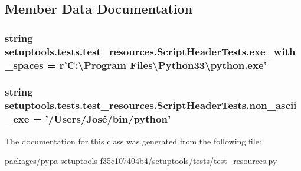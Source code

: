 \subsection{Member Data Documentation}
\hypertarget{classsetuptools_1_1tests_1_1test__resources_1_1ScriptHeaderTests_af12086cb9bcdff2fd9d002c5fb443a5a}{}
\subsubsection[{exe\+\_\+with\+\_\+spaces}]{\setlength{\rightskip}{0pt plus 5cm}string setuptools.\+tests.\+test\+\_\+resources.\+Script\+Header\+Tests.\+exe\+\_\+with\+\_\+spaces = {\bf r}'C\+:\textbackslash{}\+Program Files\textbackslash{}\+Python33\textbackslash{}python.\+exe'\hspace{0.3cm}{\ttfamily [static]}}\label{classsetuptools_1_1tests_1_1test__resources_1_1ScriptHeaderTests_af12086cb9bcdff2fd9d002c5fb443a5a}
\hypertarget{classsetuptools_1_1tests_1_1test__resources_1_1ScriptHeaderTests_ae320b7b55e428070d710f48a4db0ae01}{}
\subsubsection[{non\+\_\+ascii\+\_\+exe}]{\setlength{\rightskip}{0pt plus 5cm}string setuptools.\+tests.\+test\+\_\+resources.\+Script\+Header\+Tests.\+non\+\_\+ascii\+\_\+exe = '/Users/José/bin/python'\hspace{0.3cm}{\ttfamily [static]}}\label{classsetuptools_1_1tests_1_1test__resources_1_1ScriptHeaderTests_ae320b7b55e428070d710f48a4db0ae01}


The documentation for this class was generated from the following file\+:\begin{DoxyCompactItemize}
\item 
packages/pypa-\/setuptools-\/f35c107404b4/setuptools/tests/\hyperlink{test__resources_8py}{test\+\_\+resources.\+py}\end{DoxyCompactItemize}
